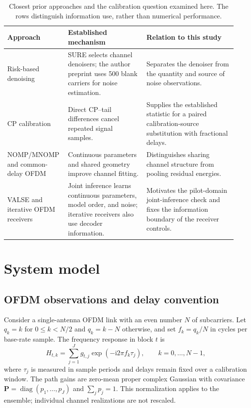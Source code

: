 \begin{table}[t]
\centering
\caption{Closest prior approaches and the calibration question examined here.
The rows distinguish information use, rather than numerical performance.}
\label{tab:priorwork}
\small
\renewcommand{\arraystretch}{1.12}
\begin{tabular}{@{}>{\raggedright\arraybackslash}p{0.23\linewidth}>{\raggedright\arraybackslash}p{0.33\linewidth}>{\raggedright\arraybackslash}p{0.38\linewidth}@{}}
\toprule
Approach & Established mechanism & Relation to this study \\
\midrule
Risk-based denoising \cite{upadhya2016risk} & SURE selects channel denoisers;
the author preprint uses 500 blank carriers for noise estimation. & Separates
the denoiser from the quantity and source of noise observations. \\
CP calibration \cite{cui2006pdpnoise} & Direct CP--tail differences cancel
repeated signal samples. & Supplies the established statistic for a paired
calibration-source substitution with fractional delays. \\
NOMP/MNOMP and common-delay OFDM \cite{mamandipoor2016nomp,zhu2019mnomp,gao2014superresolution}
& Continuous parameters and shared geometry improve channel fitting. &
Distinguishes sharing channel structure from pooling residual energies. \\
VALSE and iterative OFDM receivers \cite{badiu2017valse,hansen2018iterative,wan2022jccdvalse}
& Joint inference learns continuous parameters, model order, and noise;
iterative receivers also use decoder information. & Motivates the pilot-domain
joint-inference check and fixes the information boundary of the receiver controls. \\
\bottomrule
\end{tabular}
\end{table}

\section{System model}
\label{sec:system}

\subsection{OFDM observations and delay convention}
Consider a single-antenna OFDM link with an even number $N$ of subcarriers. Let
$q_k=k$ for $0\leq k<N/2$ and $q_k=k-N$ otherwise, and set $f_k=q_k/N$ in cycles
per base-rate sample. The frequency response in block $t$ is
\begin{equation}
 H_{t,k}=\sum_{j=1}^{J}g_{t,j}\exp(-\mathrm{i}2\pi f_k\tau_j),
 \qquad k=0,\ldots,N-1,
 \label{eq:channel}
\end{equation}
where $\tau_j$ is measured in sample periods and delays remain fixed over a
calibration window. The path gains are zero-mean proper complex Gaussian with
covariance $\mathbf P=\operatorname{diag}(p_1,\ldots,p_J)$ and
$\sum_jp_j=1$. This normalization applies to the ensemble; individual channel
realizations are not rescaled.

